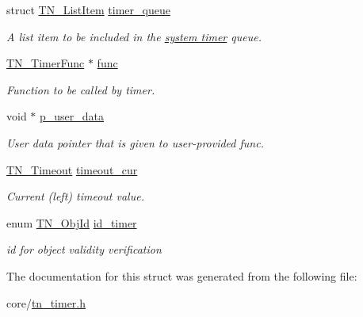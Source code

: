 \begin{DoxyCompactItemize}
\item 
\hypertarget{structTN__Timer_a9418f1d84fa83d87197f3457ddb74e27}{struct \hyperlink{structTN__ListItem}{T\+N\+\_\+\+List\+Item} \hyperlink{structTN__Timer_a9418f1d84fa83d87197f3457ddb74e27}{timer\+\_\+queue}}\label{structTN__Timer_a9418f1d84fa83d87197f3457ddb74e27}

\begin{DoxyCompactList}\small\item\em A list item to be included in the {\itshape \hyperlink{quick_guide_time_ticks}{system timer}} queue. \end{DoxyCompactList}\item 
\hypertarget{structTN__Timer_a154ff9bb98135481b1874bdd8d6f2b9c}{\hyperlink{tn__timer_8h_a98be38210cd5a636dc4170e087ea0e67}{T\+N\+\_\+\+Timer\+Func} $\ast$ \hyperlink{structTN__Timer_a154ff9bb98135481b1874bdd8d6f2b9c}{func}}\label{structTN__Timer_a154ff9bb98135481b1874bdd8d6f2b9c}

\begin{DoxyCompactList}\small\item\em Function to be called by timer. \end{DoxyCompactList}\item 
\hypertarget{structTN__Timer_aaf753d5fb1001702f07379b2ed7ac177}{void $\ast$ \hyperlink{structTN__Timer_aaf753d5fb1001702f07379b2ed7ac177}{p\+\_\+user\+\_\+data}}\label{structTN__Timer_aaf753d5fb1001702f07379b2ed7ac177}

\begin{DoxyCompactList}\small\item\em User data pointer that is given to user-\/provided {\ttfamily func}. \end{DoxyCompactList}\item 
\hypertarget{structTN__Timer_a189fd9a922651e0cdfa442f05ff4423f}{\hyperlink{tn__common_8h_a34c07c1fa20ae71d17817d28a41957fe}{T\+N\+\_\+\+Timeout} \hyperlink{structTN__Timer_a189fd9a922651e0cdfa442f05ff4423f}{timeout\+\_\+cur}}\label{structTN__Timer_a189fd9a922651e0cdfa442f05ff4423f}

\begin{DoxyCompactList}\small\item\em Current (left) timeout value. \end{DoxyCompactList}\item 
\hypertarget{structTN__Timer_a27482d3470455064da95b9453ae87156}{enum \hyperlink{tn__common_8h_ae779dd1f6735f6e139fb70acd004d976}{T\+N\+\_\+\+Obj\+Id} \hyperlink{structTN__Timer_a27482d3470455064da95b9453ae87156}{id\+\_\+timer}}\label{structTN__Timer_a27482d3470455064da95b9453ae87156}

\begin{DoxyCompactList}\small\item\em id for object validity verification \end{DoxyCompactList}\end{DoxyCompactItemize}


The documentation for this struct was generated from the following file\+:\begin{DoxyCompactItemize}
\item 
core/\hyperlink{tn__timer_8h}{tn\+\_\+timer.\+h}\end{DoxyCompactItemize}
